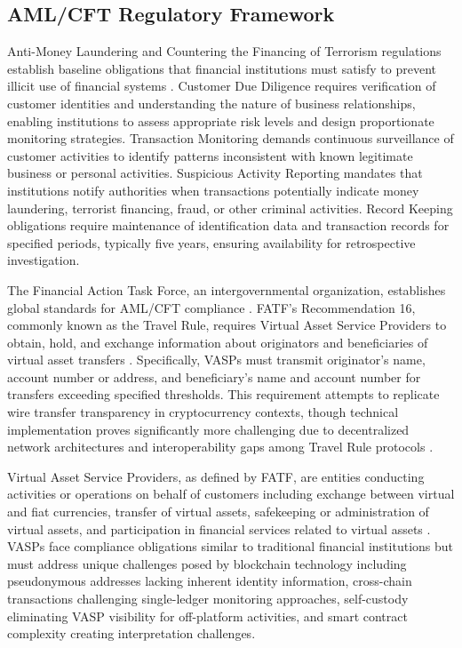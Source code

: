 \subsection{AML/CFT Regulatory Framework}

Anti-Money Laundering and Countering the Financing of Terrorism regulations establish baseline obligations that financial institutions must satisfy to prevent illicit use of financial systems \cite{financialactiontaskforcefatf2012internationalstandardscombating}. Customer Due Diligence requires verification of customer identities and understanding the nature of business relationships, enabling institutions to assess appropriate risk levels and design proportionate monitoring strategies. Transaction Monitoring demands continuous surveillance of customer activities to identify patterns inconsistent with known legitimate business or personal activities. Suspicious Activity Reporting mandates that institutions notify authorities when transactions potentially indicate money laundering, terrorist financing, fraud, or other criminal activities. Record Keeping obligations require maintenance of identification data and transaction records for specified periods, typically five years, ensuring availability for retrospective investigation.

The Financial Action Task Force, an intergovernmental organization, establishes global standards for AML/CFT compliance \cite{financialactiontaskforcefatf2012internationalstandardscombating}. FATF's Recommendation 16, commonly known as the Travel Rule, requires Virtual Asset Service Providers to obtain, hold, and exchange information about originators and beneficiaries of virtual asset transfers \cite{force2021updatedguidanceriskbased}. Specifically, VASPs must transmit originator's name, account number or address, and beneficiary's name and account number for transfers exceeding specified thresholds. This requirement attempts to replicate wire transfer transparency in cryptocurrency contexts, though technical implementation proves significantly more challenging due to decentralized network architectures and interoperability gaps among Travel Rule protocols \cite{force2021opportunitieschallengesnew}.

Virtual Asset Service Providers, as defined by FATF, are entities conducting activities or operations on behalf of customers including exchange between virtual and fiat currencies, transfer of virtual assets, safekeeping or administration of virtual assets, and participation in financial services related to virtual assets \cite{force2021updatedguidanceriskbased}. VASPs face compliance obligations similar to traditional financial institutions but must address unique challenges posed by blockchain technology including pseudonymous addresses lacking inherent identity information, cross-chain transactions challenging single-ledger monitoring approaches, self-custody eliminating VASP visibility for off-platform activities, and smart contract complexity creating interpretation challenges.

